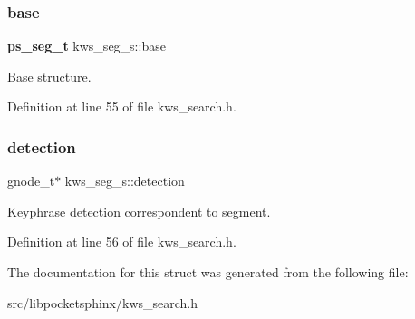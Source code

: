 \subsubsection{base}
{\footnotesize\ttfamily \textbf{ ps\+\_\+seg\+\_\+t} kws\+\_\+seg\+\_\+s\+::base}



Base structure. 



Definition at line 55 of file kws\+\_\+search.\+h.

\mbox{\label{structkws__seg__s_a5de99d98b2be6e0348033c9fc05ec139}} 
\subsubsection{detection}
{\footnotesize\ttfamily gnode\+\_\+t$\ast$ kws\+\_\+seg\+\_\+s\+::detection}



Keyphrase detection correspondent to segment. 



Definition at line 56 of file kws\+\_\+search.\+h.



The documentation for this struct was generated from the following file\+:\begin{DoxyCompactItemize}
\item 
src/libpocketsphinx/kws\+\_\+search.\+h\end{DoxyCompactItemize}
